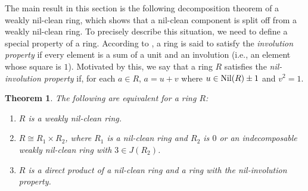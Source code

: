 \documentclass[12]{amsart}
\newtheorem{thm}{Theorem}
\theoremstyle{definition}
\numberwithin{equation}{section}
\begin{document}
The main result in this section is the following decomposition theorem of a weakly nil-clean ring, which shows that a nil-clean component is split off from a weakly nil-clean ring. To precisely describe this situation, we need to define a special property of a ring.  According to \cite{GMW07}, a ring is said to satisfy the {\it involution property} if every element is a sum of a unit and an involution (i.e., an element whose square is $1$). Motivated by this, we say that a ring $R$ satisfies the {\it nil-involution property} if, for each $a\in R$, $a=u+v$ where $u\in {\rm Nil}(R)\pm 1$ and $v^2=1$.

\begin{thm}\label{description} The following are equivalent for a ring $R$:
\begin{enumerate}
\item $R$ is a weakly nil-clean ring.
\item $R\cong R_1\times R_2$, where $R_1$ is a nil-clean ring and $R_2$ is $0$ or an indecomposable weakly nil-clean ring with $3\in J(R_2)$. 
\item $R$ is a direct product of a nil-clean ring and a ring with the nil-involution property.
\end{enumerate}
\end{thm}
\end{document}
